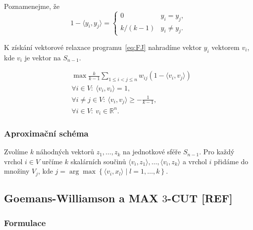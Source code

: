 \noindent Poznamenejme, že
$$
    1 - \langle y_i, y_j \rangle = 
    \begin{cases}
        0           & y_i = y_j, \\
        k / (k - 1) & y_i \neq y_j.
    \end{cases}
$$

K získání vektorové relaxace programu~\ref{eq:FJ} nahradíme vektor $y_i$ vektorem $v_i$, kde $v_i$ je vektor na $S_{n-1}$.

\begin{equation}\tag{FJ-RELAX}
    \begin{split}
        &\max \frac{k}{k-1} \sum_{1 \leq i < j \leq n} w_{ij} (1 - \langle v_i, v_j \rangle) \\
        &\forall i \in V:\ \langle v_i, v_i \rangle = 1, \\
        &\forall i \neq j \in V:\ \langle v_i, v_j \rangle \geq -\frac{1}{k-1}, \\
        &\forall i \in V:\ v_i \in \mathbb{R}^n.
    \end{split}
    \label{eq:FJ-RELAX}
\end{equation}


\subsubsection*{Aproximační schéma}

Zvolíme $k$ náhodných vektorů $z_1, \dots, z_k$ na jednotkové sféře $S_{n-1}$. Pro každý vrchol $i \in V$ určíme $k$ skalárních součinů $\langle v_i, z_1 \rangle, \dots, \langle v_i, z_k \rangle$ a vrchol $i$ přidáme do množiny $V_j$, kde $j = \arg \max \left\{ \langle v_i, x_l \rangle \mid l = 1, \dots, k \right\}$.


\subsection{Goemans-Williamson a MAX $3$-CUT \textbf{[REF]}}

\subsubsection*{Formulace}


